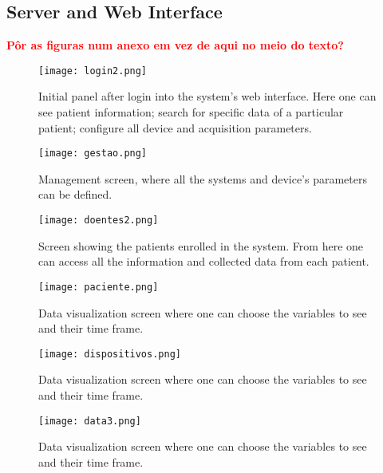 \FloatBarrier

\subsection{Server and Web Interface}

\bigskip
\textcolor{red}{\Large \textbf{Pôr as figuras num anexo em vez de aqui no meio do texto?}}
\bigskip

\begin{figure}[h!]
	\centering
	\texttt{[image: login2.png]}
	\captionsetup{width=0.4\textwidth}
	\caption{Initial panel after login into the system's web interface. Here one can see patient information; search for specific data of a particular patient; configure all device and acquisition parameters.}
	\label{figure:UI1}
	
\end{figure}%

\begin{figure}[h!]
	\centering
	\texttt{[image: gestao.png]}
	\captionsetup{width=0.8\textwidth}
	\caption{Management screen, where all the systems and device's parameters can be defined.}
	\label{figure:UI_gestao}
	
\end{figure}%

\begin{figure}[h!]
	\centering
	\texttt{[image: doentes2.png]}
	\captionsetup{width=0.8\textwidth}
	\caption{Screen showing the patients enrolled in the system. From here one can access all the information and collected data from each patient.}
	\label{figure:UI2}
\end{figure}%


\begin{figure}[h!]
	\centering
	\texttt{[image: paciente.png]}
	\captionsetup{width=0.8\textwidth}
	\caption{Data visualization screen where one can choose the variables to see and their time frame.}
	\label{figure:UI4}
\end{figure}%

\begin{figure}[h!]
	\centering
	\texttt{[image: dispositivos.png]}
	\captionsetup{width=0.8\textwidth}
	\caption{Data visualization screen where one can choose the variables to see and their time frame.}
	\label{figure:UI5}
\end{figure}%

\begin{figure}[h!]
	\centering
	\texttt{[image: data3.png]}
	\caption{Data visualization screen where one can choose the variables to see and their time frame.}
	\label{figure:UI3}
\end{figure}%


